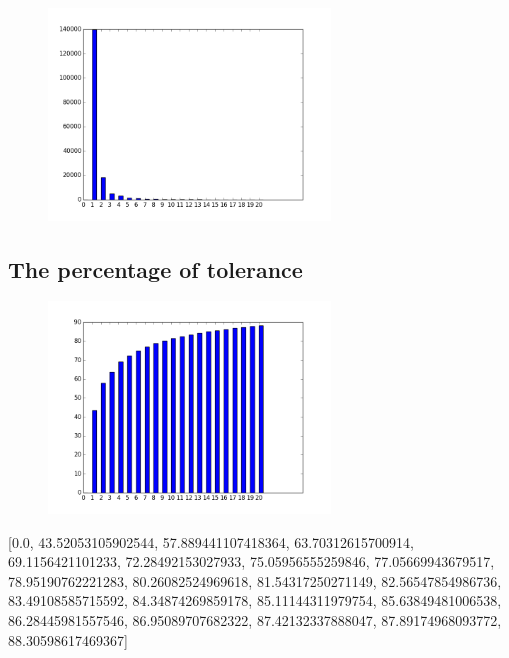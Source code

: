\documentclass[10pt, conference, compsocconf]{IEEEtran}
\begin{document}
\begin{figure}[H]\centering\includegraphics[width=75mm,scale=0.5]{BasedonCookienumberofusersfingerprint}\end{figure}\subsection{The percentage of tolerance}
\begin{figure}[H]\centering\includegraphics[width=75mm,scale=0.5]{BasedonCookietolerance}\end{figure}[0.0, 43.52053105902544, 57.889441107418364, 63.70312615700914, 69.1156421101233, 72.28492153027933, 75.05956555259846, 77.05669943679517, 78.95190762221283, 80.26082524969618, 81.54317250271149, 82.56547854986736, 83.49108585715592, 84.34874269859178, 85.11144311979754, 85.63849481006538, 86.28445981557546, 86.95089707682322, 87.42132337888047, 87.89174968093772, 88.30598617469367]
\end{document}

